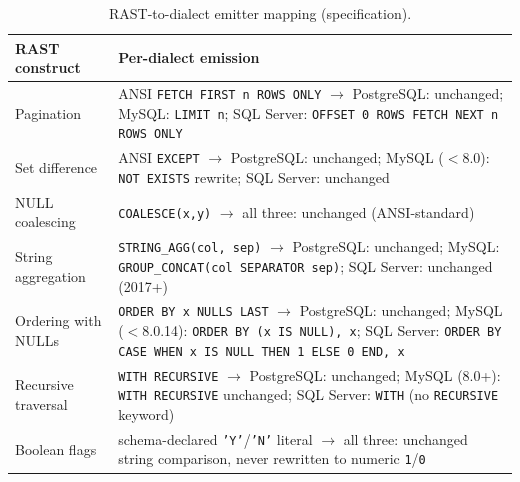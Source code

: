\documentclass[twocolumn]{svjour3}
\begin{document}
\begin{table}[t]
\centering
\caption{RAST-to-dialect emitter mapping (specification).}
\label{tab:emitter}
\footnotesize
\begin{tabular}{@{}lp{}@{}}
\toprule
\textbf{RAST construct} & \textbf{Per-dialect emission} \\
\midrule
Pagination & ANSI \texttt{FETCH FIRST n ROWS ONLY} $\to$ PostgreSQL: unchanged; MySQL: \texttt{LIMIT n}; SQL Server: \texttt{OFFSET 0 ROWS FETCH NEXT n ROWS ONLY} \\
Set difference & ANSI \texttt{EXCEPT} $\to$ PostgreSQL: unchanged; MySQL ($<$8.0): \texttt{NOT EXISTS} rewrite; SQL Server: unchanged \\
NULL coalescing & \texttt{COALESCE(x,y)} $\to$ all three: unchanged (ANSI-standard) \\
String aggregation & \texttt{STRING\_AGG(col, sep)} $\to$ PostgreSQL: unchanged; MySQL: \texttt{GROUP\_CONCAT(col SEPARATOR sep)}; SQL Server: unchanged (2017+) \\
Ordering with NULLs & \texttt{ORDER BY x NULLS LAST} $\to$ PostgreSQL: unchanged; MySQL ($<$8.0.14): \texttt{ORDER BY (x IS NULL), x}; SQL Server: \texttt{ORDER BY CASE WHEN x IS NULL THEN 1 ELSE 0 END, x} \\
Recursive traversal & \texttt{WITH RECURSIVE} $\to$ PostgreSQL: unchanged; MySQL (8.0+): \texttt{WITH RECURSIVE} unchanged; SQL Server: \texttt{WITH} (no \texttt{RECURSIVE} keyword) \\
Boolean flags & schema-declared \texttt{'Y'}/\texttt{'N'} literal $\to$ all three: unchanged string comparison, never rewritten to numeric \texttt{1}/\texttt{0} \\
\bottomrule
\end{tabular}
\end{table}
\end{document}
